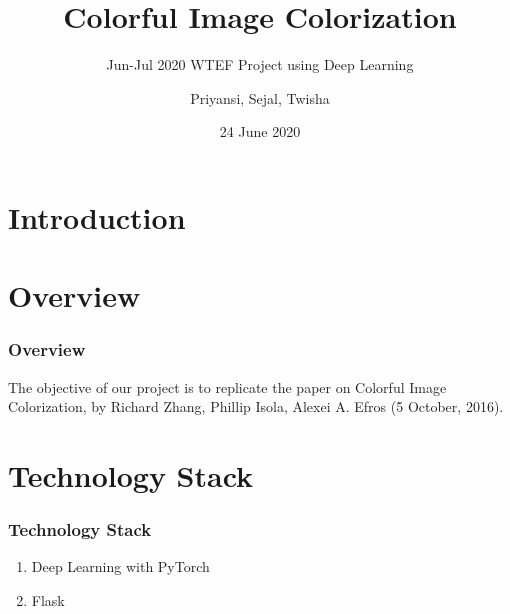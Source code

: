 \documentclass[16pt, subsection=false]{beamer}
\title{Colorful Image Colorization}
\subtitle{Jun-Jul 2020 WTEF Project using Deep Learning}
\author[Team 9]{Priyansi, Sejal, Twisha}
\date{24 June 2020}
\begin{document}
\section{Introduction}
\begin{frame}
	\titlepage
\end{frame}

\section{Overview}
\begin{frame}
	\frametitle{Overview}
	The objective of our project is to replicate the paper on Colorful Image Colorization, by Richard Zhang, Phillip Isola, Alexei A. Efros (5 October, 2016).
\end{frame}

\section{Technology Stack}
\begin{frame}
	\frametitle{Technology Stack}
	\begin{enumerate}
		\item Deep Learning with PyTorch \\
		\item Flask
	\end{enumerate}
\end{frame}
\end{document}
